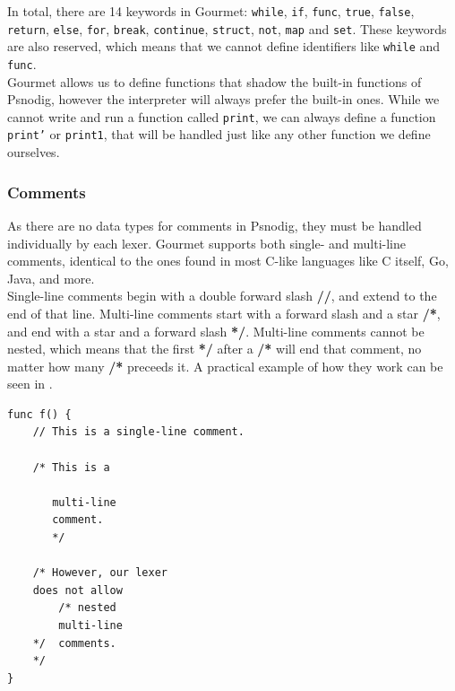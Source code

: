 In total, there are 14 keywords in Gourmet: \texttt{while}, \texttt{if}, \texttt{func}, \texttt{true}, \texttt{false}, \texttt{return}, \texttt{else}, \texttt{for}, \texttt{break}, \texttt{continue}, \texttt{struct}, \texttt{not}, \texttt{map} and \texttt{set}. These keywords are also reserved, which means that we cannot define identifiers like \texttt{while} and \texttt{func}. \\

Gourmet allows us to define functions that shadow the built-in functions of Psnodig, however the interpreter will always prefer the built-in ones. While we cannot write and run a function called \texttt{print}, we can always define a function \texttt{print’} or \texttt{print1}, that will be handled just like any other function we define ourselves.

\subsubsection{Comments}

As there are no data types for comments in Psnodig, they must be handled individually by each lexer. Gourmet supports both single- and multi-line comments, identical to the ones found in most C-like languages like C itself, Go, Java, and more. \\

Single-line comments begin with a double forward slash \textbf{//}, and extend to the end of that line. Multi-line comments start with a forward slash and a star \textbf{/*}, and end with a star and a forward slash \textbf{*/}. Multi-line comments cannot be nested, which means that the first \textbf{*/} after a \textbf{/*} will end that comment, no matter how many \textbf{/*} preceeds it. A practical example of how they work can be seen in . \\

\begin{lstlisting}[caption={Example of legal and illegal comments in a Gourmet program.}, captionpos=b, label={Example of legal and illegal comments in Gourmet.}]
func f() {
    // This is a single-line comment.

    /* This is a

       multi-line
       comment.
       */

    /* However, our lexer
    does not allow
        /* nested
        multi-line
    */  comments.
    */
}
\end{lstlisting}


